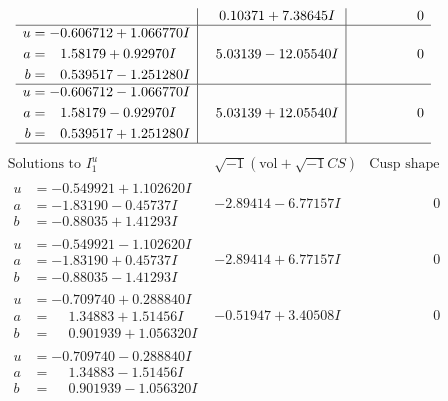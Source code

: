 \documentclass[1p]{elsarticle_modified}
\theoremstyle{definition}
\newcommand{\I}{\sqrt{-1}}
\begin{document}
$$\begin{array}{c|c|c}
 & \phantom{-}0.10371 + 7.38645 I & \phantom{-0.000000 } 0 \\ \hline\begin{aligned}
u &= -0.606712 + 1.066770 I \\
a &= \phantom{-}1.58179 + 0.92970 I \\
b &= \phantom{-}0.539517 - 1.251280 I\end{aligned}
 & \phantom{-}5.03139 - 12.05540 I & \phantom{-0.000000 } 0 \\ \hline\begin{aligned}
u &= -0.606712 - 1.066770 I \\
a &= \phantom{-}1.58179 - 0.92970 I \\
b &= \phantom{-}0.539517 + 1.251280 I\end{aligned}
 & \phantom{-}5.03139 + 12.05540 I & \phantom{-0.000000 } 0\\
 \hline 
 \end{array}$$\newpage$$\begin{array}{c|c|c}  
\text{Solutions to }I^u_{1}& \I (\text{vol} + \sqrt{-1}CS) & \text{Cusp shape}\\
 \hline 
\begin{aligned}
u &= -0.549921 + 1.102620 I \\
a &= -1.83190 - 0.45737 I \\
b &= -0.88035 + 1.41293 I\end{aligned}
 & -2.89414 - 6.77157 I & \phantom{-0.000000 } 0 \\ \hline\begin{aligned}
u &= -0.549921 - 1.102620 I \\
a &= -1.83190 + 0.45737 I \\
b &= -0.88035 - 1.41293 I\end{aligned}
 & -2.89414 + 6.77157 I & \phantom{-0.000000 } 0 \\ \hline\begin{aligned}
u &= -0.709740 + 0.288840 I \\
a &= \phantom{-}1.34883 + 1.51456 I \\
b &= \phantom{-}0.901939 + 1.056320 I\end{aligned}
 & -0.51947 + 3.40508 I & \phantom{-0.000000 } 0 \\ \hline\begin{aligned}
u &= -0.709740 - 0.288840 I \\
a &= \phantom{-}1.34883 - 1.51456 I \\
b &= \phantom{-}0.901939 - 1.056320 I\end{aligned}

\end{array}$$
\end{document}
